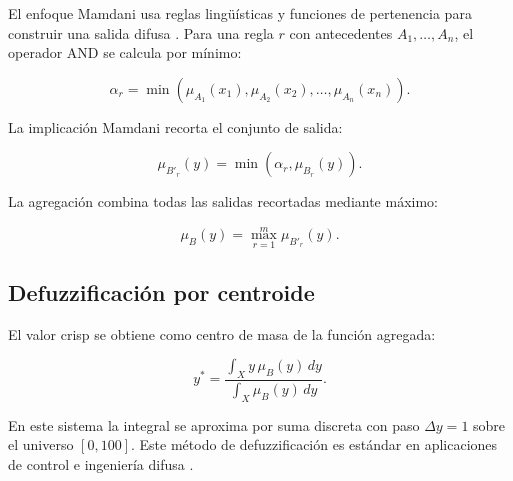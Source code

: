 El enfoque Mamdani usa reglas lingüísticas y funciones de pertenencia para construir una salida difusa \citep{mamdani1975experiment,mamdani1974application}. Para una regla $r$ con antecedentes $A_1,\ldots,A_n$, el operador AND se calcula por mínimo:

\begin{equation}
\alpha_r = \min(\mu_{A_1}(x_1), \mu_{A_2}(x_2), \ldots, \mu_{A_n}(x_n)).
\label{eq:alpha}
\end{equation}

La implicación Mamdani recorta el conjunto de salida:

\begin{equation}
\mu_{B'_r}(y)=\min(\alpha_r, \mu_{B_r}(y)).
\label{eq:clip}
\end{equation}

La agregación combina todas las salidas recortadas mediante máximo:

\begin{equation}
\mu_B(y)=\max_{r=1}^{m} \mu_{B'_r}(y).
\label{eq:aggregation}
\end{equation}

\subsection{Defuzzificación por centroide}

El valor crisp se obtiene como centro de masa de la función agregada:

\begin{equation}
y^*=\frac{\int_X y\,\mu_B(y)\,dy}{\int_X \mu_B(y)\,dy}.
\label{eq:centroid}
\end{equation}

En este sistema la integral se aproxima por suma discreta con paso $\Delta y = 1$ sobre el universo $[0,100]$. Este método de defuzzificación es estándar en aplicaciones de control e ingeniería difusa \citep{ross2010fuzzy,sugeno1985industrial}.
